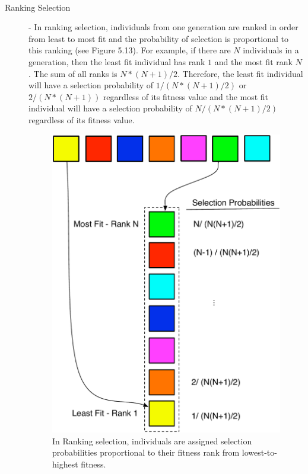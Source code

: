\documentclass[a4paper,12pt]{report} 	%
\numberwithin{figure}{chapter}
\numberwithin{table}{chapter}
\numberwithin{equation}{chapter}
\begin{document}
\begin{flushleft}
\begin{description}
\\
\item [Ranking Selection] - In ranking selection, individuals from one generation are ranked in order from least to most fit and the probability of selection is proportional to this ranking (see Figure 5.13). For example, if there are $N$ individuals in a generation, then the least fit individual has rank $1$ and the most fit rank $N$. The sum of all ranks is $N*(N+1)/2$. Therefore, the least fit individual will have a selection probability of $1/(N*(N+1)/2)$ or $2/(N*(N+1))$ regardless of its fitness value and the most fit individual will have a selection probability of $N/(N*(N+1)/2)$ regardless of its fitness value. 
\begin{figure}[h!]
\begin{center}
\includegraphics[scale = 0.6]{RankSelection}
\caption[Ranking Selection]{In Ranking selection, individuals are assigned selection probabilities proportional to their fitness rank from lowest-to-highest fitness.}

\end{center}
\end{figure}
\end{description}
\end{flushleft}
\end{document}
